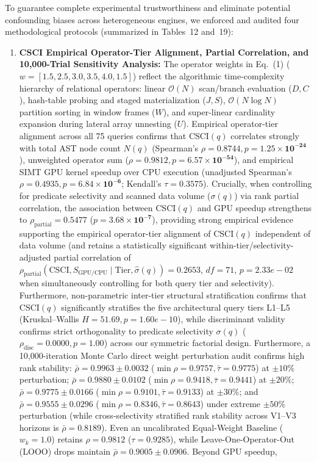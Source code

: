 \documentclass[10pt,a4paper]{article}
\begin{document}
To guarantee complete experimental trustworthiness and eliminate potential confounding biases across heterogeneous engines, we enforced and audited four methodological protocols (summarized in Tables~12 and~19):
\begin{enumerate}[leftmargin=1.5em,itemsep=2pt]
    \item \textbf{CSCI Empirical Operator-Tier Alignment, Partial Correlation, and 10,000-Trial Sensitivity Analysis:} The operator weights in Eq.~(1) ($w = [1.5, 2.5, 3.0, 3.5, 4.0, 1.5]$) reflect the algorithmic time-complexity hierarchy of relational operators: linear $\mathcal{O}(N)$ scan/branch evaluation ($D, C$), hash-table probing and staged materialization ($J, S$), $\mathcal{O}(N \log N)$ partition sorting in window frames ($W$), and super-linear cardinality expansion during lateral array unnesting ($U$). Empirical operator-tier alignment across all 75 queries confirms that $\text{CSCI}(q)$ correlates strongly with total AST node count $N(q)$ (Spearman's $\rho = \mathbf{0.8744}, p = \mathbf{1.25 \times 10^{-24}}$), unweighted operator sum ($\rho = \mathbf{0.9812}, p = \mathbf{6.57 \times 10^{-54}}$), and empirical SIMT GPU kernel speedup over CPU execution (unadjusted Spearman's $\rho = \mathbf{0.4935}, p = \mathbf{6.84 \times 10^{-6}}$; Kendall's $\tau = \mathbf{0.3575}$). Crucially, when controlling for predicate selectivity and scanned data volume ($\sigma(q)$) via rank partial correlation, the association between $\text{CSCI}(q)$ and GPU speedup strengthens to $\rho_{\text{partial}} = \mathbf{0.5477}$ ($p = \mathbf{3.68 \times 10^{-7}}$), providing strong empirical evidence supporting the empirical operator-tier alignment of $\text{CSCI}(q)$ independent of data volume (and retains a statistically significant within-tier/selectivity-adjusted partial correlation of $\rho_{\text{partial}}(\text{CSCI}, S_{\text{GPU/CPU}} \mid \text{Tier}, \hat{\sigma}(q)) = 0.2653$, $df=71$, $p=2.33e-02$ when simultaneously controlling for both query tier and selectivity). Furthermore, non-parametric inter-tier structural stratification confirms that $\text{CSCI}(q)$ significantly stratifies the five architectural query tiers L1--L5 (Kruskal--Wallis $H = 51.69, p = 1.60e-10$), while discriminant validity confirms strict orthogonality to predicate selectivity $\sigma(q)$ ($\rho_{\text{disc}} = 0.0000, p = 1.00$) across our symmetric factorial design. Furthermore, a 10,000-iteration Monte Carlo direct weight perturbation audit confirms high rank stability: $\bar{\rho} = \mathbf{0.9963} \pm 0.0032$ ($\min \rho = 0.9757, \bar{\tau}=0.9775$) at $\pm 10\%$ perturbation; $\bar{\rho} = \mathbf{0.9880} \pm 0.0102$ ($\min \rho = 0.9418, \bar{\tau}=0.9441$) at $\pm 20\%$; $\bar{\rho} = \mathbf{0.9775} \pm 0.0166$ ($\min \rho = 0.9101, \bar{\tau}=0.9133$) at $\pm 30\%$; and $\bar{\rho} = \mathbf{0.9555} \pm 0.0296$ ($\min \rho = 0.8346, \bar{\tau}=0.8643$) under extreme $\pm 50\%$ perturbation (while cross-selectivity stratified rank stability across V1--V3 horizons is $\bar{\rho}=0.8189$). Even an uncalibrated Equal-Weight Baseline ($w_k = 1.0$) retains $\rho = \mathbf{0.9812}$ ($\tau = 0.9285$), while Leave-One-Operator-Out (LOOO) drops maintain $\bar{\rho} = \mathbf{0.9005} \pm 0.0906$. Beyond GPU speedup, 
\end{enumerate}
\end{document}
